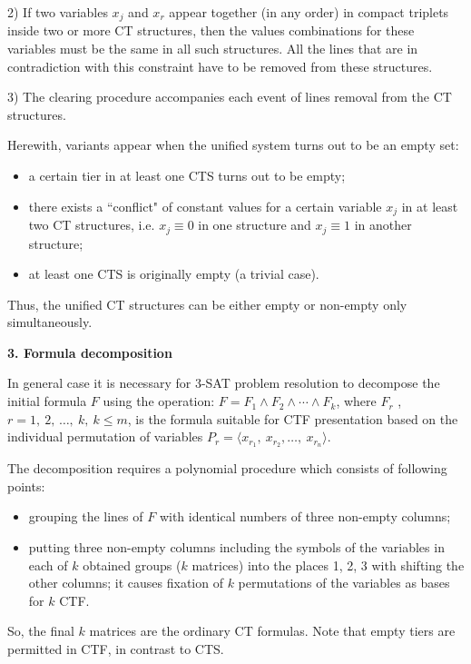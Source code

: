 \documentclass[12pt, a4paper]{article}
\begin{document}
\hangindent=1.1cm
2)  If two variables $x_j$ and $x_r$ appear together (in any order) in compact triplets inside two or more CT structures, then the values combinations for these variables must be the same in all such structures. All the lines that are in contradiction with this constraint have to be removed from these structures.

\hangindent=1.1cm
3)  The clearing procedure accompanies each event of lines removal from the CT structures.

Herewith, variants appear when the unified system turns out to be an empty set:
\begin{itemize}
\item a certain tier in at least one CTS turns out to be empty;
\item there exists a ``conflict" of constant
values for a certain variable $x_j$ in at least two CT structures, i.e. $x_j\equiv 0$ in one structure and  $x_j\equiv 1$
in another structure;
\item at least one CTS is originally empty (a trivial case).
\end{itemize}

Thus, the unified CT structures can be either empty or non-empty only simultaneously.


\par\medskip

\textbf{3. Formula decomposition}

In general case it is necessary for 3-SAT problem resolution to decompose the initial formula $F$  using the operation: $F=F_1\wedge F_2\wedge  \cdots \wedge F_k$,  where $F_r$ , ${r=1,\ 2,\, \ldots,\ k,}\ k\le m$, is the formula suitable for CTF presentation based on the individual permutation of variables ${P_r=\langle x_{r_1},\ x_{r_2}, \ldots,\ x_{r_n}\rangle}$.

The decomposition requires a polynomial procedure which consists of following points:
\begin{itemize}
\item grouping the lines of  $F$  with identical numbers of three
	non-empty columns;
\item	putting three non-empty columns including the symbols of the variables in each of $k$ obtained groups ($k$ matrices) into the places 1, 2, 3 with shifting the other columns; it causes fixation of  $k$ permutations of the variables as bases for  $k$  CTF.
\end{itemize}

So, the final  $k$  matrices are the ordinary CT formulas. Note that empty tiers are permitted in CTF, in contrast to CTS.
\end{document}
